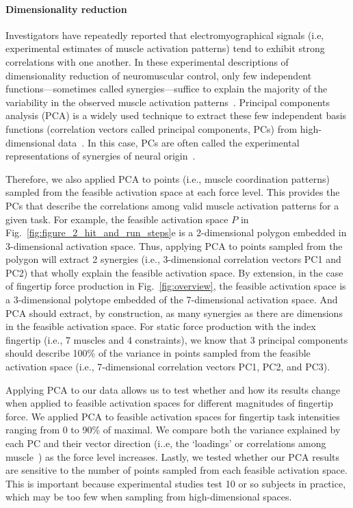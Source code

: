 \documentclass[9pt,twocolumn,twoside,lineno]{pnas-new}
\begin{document}
{\paragraph*{Dimensionality reduction}

Investigators have repeatedly reported that electromyographical signals (i.e, experimental estimates of muscle activation patterns) tend to exhibit strong correlations with one another.
In these experimental descriptions of dimensionality reduction of neuromuscular control, only few independent functions---sometimes called synergies---suffice to explain the majority of the variability in the observed muscle activation patterns~\cite{kutch2012challenges,steele2013number,bizzi2013neural,dingwell2010walkingvariability,steele2015consequences,alessandro2013musclesynergies,krishnamoorthy2003muscle}.
Principal components analysis (PCA) is a widely used technique to extract these few independent basis functions (correlation vectors called principal components, PCs) from high-dimensional data~\cite{Clewley2008Estimating}.
In this case, PCs are often called the experimental representations of synergies of neural origin~\cite{kutch2012challenges}.

Therefore, we also applied PCA to points (i.e., muscle coordination patterns) sampled from the feasible activation space at each force level.
This provides the PCs that describe the correlations among valid muscle activation patterns for a given task.
For example, the feasible activation space $P$ in Fig.~\ref{fig:figure_2_hit_and_run_steps}e is a 2-dimensional polygon embedded in 3-dimensional activation space. Thus, applying PCA to points sampled from the polygon will extract 2 synergies (i.e., 3-dimensional correlation vectors PC1 and PC2) that wholly explain the feasible activation space. By extension, in the case of fingertip force production in Fig.~\ref{fig:overview}, the feasible activation space is a 3-dimensional polytope embedded of the 7-dimensional activation space. And PCA should extract, by construction, as many synergies as there are dimensions in the feasible activation space. For static force production with the index fingertip (i.e., 7 muscles and 4 constraints), we know that 3 principal components should describe 100\% of the variance in points sampled from the feasible activation space (i.e., 7-dimensional correlation vectors PC1, PC2, and PC3).

Applying PCA to our data allows us to test whether and how its results change when applied to feasible activation spaces for different magnitudes of fingertip force. We applied PCA to feasible activation spaces for fingertip task intensities ranging from 0 to 90\% of maximal.
We compare both the variance explained by each PC and their vector direction (i..e, the `loadings' or correlations among muscle~\cite{valero2016robot}) as the force level increases.
Lastly, we tested whether our PCA results are sensitive to the number of points sampled from each feasible activation space. This is important because experimental studies test 10 or so subjects in practice, which may be too few when sampling from high-dimensional spaces.




}
\end{document}
